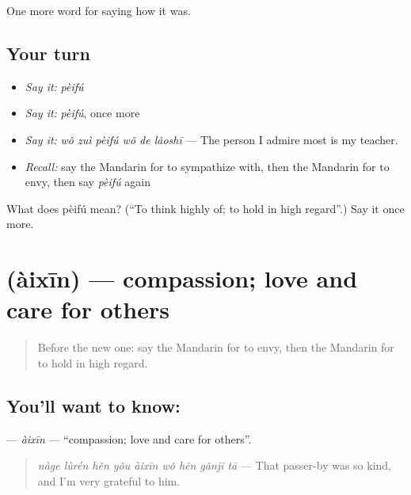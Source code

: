 \begin{grammarlens}[title={What you've built}]
One more word for saying how it was.
\end{grammarlens}

\subsection*{Your turn}
\begin{itemize}
\raggedright
  \item \emph{Say it:} \emph{pèifú}
  \item \emph{Say it:} \emph{pèifú}, once more
  \item \emph{Say it:} \emph{wǒ zuì pèifú wǒ de lǎoshī} — The person I admire most is my teacher.
  \item \emph{Recall:} say the Mandarin for to sympathize with, then the Mandarin for to envy, then say \emph{pèifú} again
\end{itemize}

\begin{tcolorbox}[breakable,colback=teal!4,colframe=teal!35!black,title={Before you move on}]
What does pèifú mean? (\textquotedblleft{}To think highly of; to hold in high regard\textquotedblright{}.) Say it once more.
\end{tcolorbox}
\section[\texorpdfstring{\zh{爱心} (àixīn)}{爱心 (àixīn)}]{ (àixīn) — compassion; love and care for others}

\label{lesson:ZH-C461-aixin}



\begin{quote}
Before the new one: say the Mandarin for to envy, then the Mandarin for to hold in high regard.
\end{quote}

\subsection*{You'll want to know: }
\textbf{} — \emph{àixīn} — \textquotedblleft{}compassion; love and care for others\textquotedblright{}.

\begin{quote}
\emph{nàge lùrén hěn yǒu àixīn wǒ hěn gǎnjī tā} — That passer-by was so kind, and I'm very grateful to him.
\end{quote}

